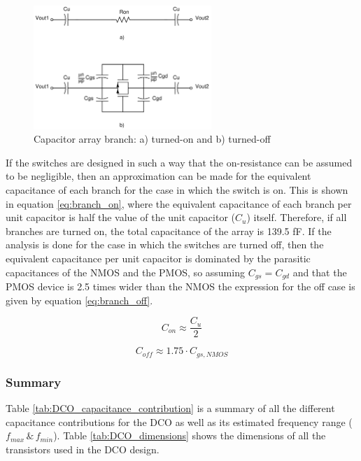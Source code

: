 \begin{figure}[H]
    \centering
    \includegraphics[width=0.6\textwidth]{figures/DCO_switches.png}
    \caption{Capacitor array branch: a) turned-on and b) turned-off}
    \label{fig:DCO_switches}
\end{figure}

If the switches are designed in such a way that the on-resistance can be assumed to be negligible, then an approximation can be made for the equivalent capacitance of each branch for the case in which the switch
is on. This is shown in equation \eqref{eq:branch_on}, where the equivalent capacitance of each branch per unit capacitor is half the value of the unit capacitor ($C_u$) itself. Therefore, if all branches are 
turned on, the total capacitance of the array is 139.5 fF. If the analysis is done for the case in which the switches are turned off, then the equivalent capacitance per unit capacitor is dominated by the parasitic
capacitances of the NMOS and the PMOS, so assuming $C_{gs} = C_{gd}$ and that the PMOS device is 2.5 times wider than the NMOS the expression for the off case is given by equation \eqref{eq:branch_off}.

\begin{equation}
    C_{on} \approx \frac{C_u}{2}
    \label{eq:branch_on}
\end{equation}

\begin{equation}
    C_{off} \approx 1.75 \cdot C_{gs, NMOS}
    \label{eq:branch_off}
\end{equation}

\subsubsection{Summary}

Table \ref{tab:DCO_capacitance_contribution} is a summary of all the different capacitance contributions for the DCO as well as its estimated frequency range ($f_{max} \, \& \, f_{min}$). Table \ref{tab:DCO_dimensions}
shows the dimensions of all the transistors used in the DCO design.

